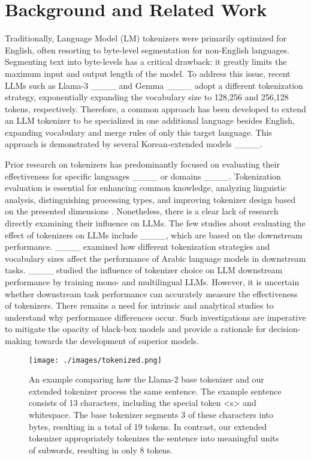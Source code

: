 \section{Background and Related Work}
Traditionally, Language Model (LM) tokenizers were primarily optimized for English, often resorting to byte-level segmentation for non-English languages. Segmenting text into byte-levels has a critical drawback: it greatly limits the maximum input and output length of the model. To address this issue, recent LLMs such as Llama-3 ____ and Gemma ____ adopt a different tokenization strategy, exponentially expanding the vocabulary size to 128,256 and 256,128 tokens, respectively. Therefore, a common approach has been developed to extend an LLM tokenizer to be specialized in one additional language besides English, expanding vocabulary and merge rules of only this target language. This approach is demonstrated by several Korean-extended models ____.

Prior research on tokenizers has predominantly focused on evaluating their effectiveness for specific languages ____ or domains ____. Tokenization evaluation is essential for enhancing common knowledge, analyzing linguistic analysis, distinguishing processing types, and improving tokenizer design based on the presented dimensions \citep {1998TowardsTE}. Nonetheless, there is a clear lack of research directly examining their influence on LLMs. The few studies about evaluating the effect of tokenizers on LLMs include ____, which are based on the downstream performance. ____ examined how different tokenization strategies and vocabulary sizes affect the performance of Arabic language models in downstream tasks. ____ studied the influence of tokenizer choice on LLM downstream performance by training mono- and multilingual LLMs. However, it is uncertain whether downstream task performance can accurately measure the effectiveness of tokenizers. There remains a need for intrinsic and analytical studies to understand why performance differences occur. Such investigations are imperative to mitigate the opacity of black-box models and provide a rationale for decision-making towards the development of superior models.


\begin{figure}[h] 
    \centering
    \texttt{[image: ./images/tokenized.png]}
    \caption{An example comparing how the Llama-2 base tokenizer and our extended tokenizer process the same sentence. The example sentence consists of 13 characters, including the special token <s> and whitespace. The base tokenizer segments 3 of these characters into bytes, resulting in a total of 19 tokens. In contrast, our extended tokenizer appropriately tokenizes the sentence into meaningful units of subwords, resulting in only 8 tokens.}
    \label{fig:tokenized}
\end{figure}